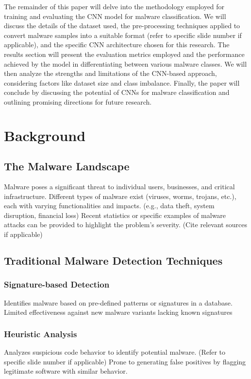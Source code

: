 \documentclass[conference]{IEEEtran}
\begin{document}
The remainder of this paper will delve into the methodology employed for training and evaluating the CNN model for malware classification. We will discuss the details of the dataset used, the pre-processing techniques applied to convert malware samples into a suitable format (refer to specific slide number if applicable), and the specific CNN architecture chosen for this research. The results section will present the evaluation metrics employed and the performance achieved by the model in differentiating between various malware classes. We will then analyze the strengths and limitations of the CNN-based approach, considering factors like dataset size and class imbalance. Finally, the paper will conclude by discussing the potential of CNNs for malware classification and outlining promising directions for future research.

\section{Background}
\subsection{The Malware Landscape}
Malware poses a significant threat to individual users, businesses, and critical infrastructure.
Different types of malware exist (viruses, worms, trojans, etc.), each with varying functionalities and impacts. (e.g., data theft, system disruption, financial loss)
Recent statistics or specific examples of malware attacks can be provided to highlight the problem's severity. (Cite relevant sources if applicable)

\subsection{Traditional Malware Detection Techniques}

\subsubsection{Signature-based Detection}
Identifies malware based on pre-defined patterns or signatures in a database. 
Limited effectiveness against new malware variants lacking known signatures

\subsubsection{Heuristic Analysis}
Analyzes suspicious code behavior to identify potential malware. (Refer to specific slide number if applicable)
Prone to generating false positives by flagging legitimate software with similar behavior.
\end{document}
